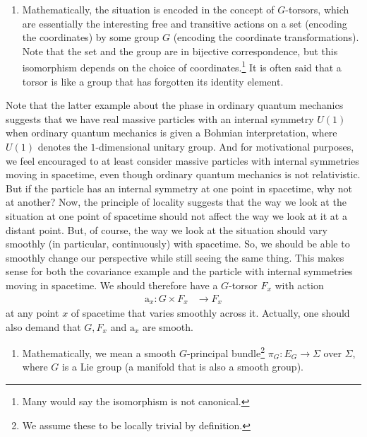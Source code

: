 \begin{enumerate}
\begin{enumerate}
\item[$\pmb{\hookrightarrow}$]
Mathematically, the situation is encoded in the concept of $G$-torsors, which are essentially the {\glqq}interesting{\grqq} free and transitive actions on a set (encoding the coordinates) by some group $G$ (encoding the coordinate transformations).
Note that the set and the group are in bijective correspondence, but this isomorphism depends on the choice of coordinates.\footnote{Many would say the isomorphism is not canonical.}
It is often said that a torsor is like a group that has forgotten its identity element.
\end{enumerate}
Note that the latter example about the phase in ordinary quantum mechanics suggests that we have real massive particles with an internal symmetry $U(1)$ when ordinary quantum mechanics is given a Bohmian interpretation, where $U(1)$ denotes the $1$-dimensional unitary group.
And for motivational purposes, we feel encouraged to at least consider massive particles with internal symmetries moving in spacetime, even though ordinary quantum mechanics is not relativistic.
\\
But if the particle has an internal symmetry at one point in spacetime, why not at another?
Now, the principle of locality suggests that the way we look at the situation at one point of spacetime should not affect the way we look at it at a distant point.
But, of course, the way we look at the situation should vary smoothly (in particular, continuously) with spacetime.
So, we should be able to smoothly change our perspective while still seeing the same thing.
This makes sense for both the covariance example and the particle with internal symmetries moving in spacetime.
We should therefore have a $G$-torsor $F_{x}$ with action
\begin{align*}
  \mathrm{a}_{x}
  \colon
  G
  \times
  F_{x}
  &\rightarrow
  F_{x}
\end{align*}
at any point $x$ of spacetime that varies smoothly across it.
Actually, one should also demand that $G,F_{x}$ and $\mathrm{a}_{x}$ are smooth.
\begin{enumerate}
\item[$\pmb{\hookrightarrow}$]
Mathematically, we mean a smooth $G$-principal bundle\footnote{We assume these to be locally trivial by definition.} $\pi_{G} \colon E_{G} \rightarrow \Sigma$ over $\Sigma$, where $G$ is a Lie group (a manifold that is also a {\glqq}smooth{\grqq} group).
\end{enumerate}

\end{enumerate}
